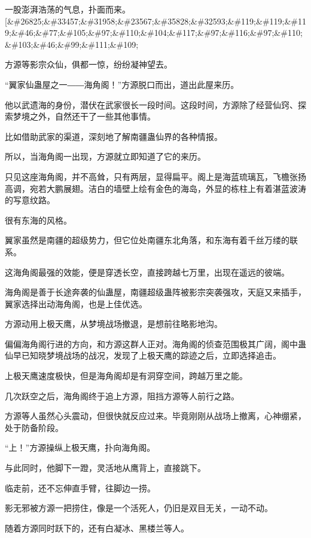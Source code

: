 
\begin{this_body}

一股澎湃浩荡的气息，扑面而来。[\&\#26825;\&\#33457;\&\#31958;\&\#23567;\&\#35828;\&\#32593;\&\#119;\&\#119;\&\#119;\&\#46;\&\#77;\&\#105;\&\#97;\&\#110;\&\#104;\&\#117;\&\#97;\&\#116;\&\#97;\&\#110;\&\#103;\&\#46;\&\#99;\&\#111;\&\#109;

方源等影宗众仙，俱都一惊，纷纷凝神望去。

“翼家仙蛊屋之一――海角阁！”方源脱口而出，道出此屋来历。

他以武遗海的身份，潜伏在武家很长一段时间。这段时间，方源除了经营仙窍、探索梦境之外，自然还干了一些其他事情。

比如借助武家的渠道，深刻地了解南疆蛊仙界的各种情报。

所以，当海角阁一出现，方源就立即知道了它的来历。

只见这座海角阁，并不高耸，只有两层，显得扁平。阁上是海蓝琉璃瓦，飞檐张扬高调，宛若大鹏展翅。洁白的墙壁上绘有金色的海岛，外显的栋柱上有着湛蓝波涛的写意纹路。

很有东海的风格。

翼家虽然是南疆的超级势力，但它位处南疆东北角落，和东海有着千丝万缕的联系。

这海角阁最强的效能，便是穿透长空，直接跨越七万里，出现在遥远的彼端。

海角阁是善于长途奔袭的仙蛊屋，南疆超级蛊阵被影宗突袭强攻，天庭又来插手，翼家选择出动海角阁，也是上佳优选。

方源动用上极天鹰，从梦境战场撤退，是想前往略影地沟。

偏偏海角阁行进的方向，和方源这群人正对。海角阁的侦查范围极其广阔，阁中蛊仙早已知晓梦境战场的战况，发现了上极天鹰的踪迹之后，立即选择追击。

上极天鹰速度极快，但是海角阁却是有洞穿空间，跨越万里之能。

几次跃空之后，海角阁终于追上方源，阻挡方源等人前行之路。

方源等人虽然心头震动，但很快就反应过来。毕竟刚刚从战场上撤离，心神绷紧，处于防备阶段。

“上！”方源操纵上极天鹰，扑向海角阁。

与此同时，他脚下一蹬，灵活地从鹰背上，直接跳下。

临走前，还不忘伸直手臂，往脚边一捞。

影无邪被方源一把捞住，像是一个活死人，仍旧是双目无关，一动不动。

随着方源同时跃下的，还有白凝冰、黑楼兰等人。


\end{this_body}
